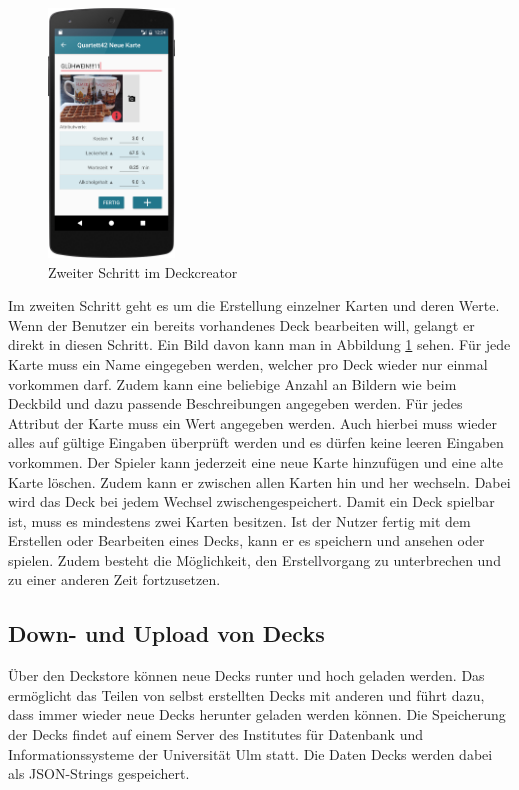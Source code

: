 \begin{figure}[htp]
	\centering
  	\includegraphics[width=0.3\textwidth]{img/screenshots/device_new_card.png}
	\caption{Zweiter Schritt im Deckcreator}
	\label{figure:implementierungdeckeditor}
\end{figure}

Im zweiten Schritt geht es um die Erstellung einzelner Karten und deren Werte. Wenn der Benutzer ein bereits vorhandenes Deck bearbeiten will, gelangt er direkt in diesen Schritt. Ein Bild davon kann man in Abbildung \ref{figure:implementierungdeckeditor} sehen. Für jede Karte muss ein Name eingegeben werden, welcher pro Deck wieder nur einmal vorkommen darf. Zudem kann eine beliebige Anzahl an Bildern wie beim Deckbild und dazu passende Beschreibungen angegeben werden. Für jedes Attribut der Karte muss ein Wert angegeben werden. Auch hierbei muss wieder alles auf gültige Eingaben überprüft werden und es dürfen keine leeren Eingaben vorkommen. Der Spieler kann jederzeit eine neue Karte hinzufügen und eine alte Karte löschen. Zudem kann er zwischen allen Karten hin und her wechseln. Dabei wird das Deck bei jedem Wechsel zwischengespeichert. Damit ein Deck spielbar ist, muss es mindestens zwei Karten besitzen. Ist der Nutzer fertig mit dem Erstellen oder Bearbeiten eines Decks, kann er es speichern und ansehen oder spielen. Zudem besteht die Möglichkeit, den Erstellvorgang zu unterbrechen und zu einer anderen Zeit fortzusetzen.

\subsection{Down- und Upload von Decks}
\label{sec:implementierung:besonderheiten:deckdownload }

Über den Deckstore können neue Decks runter und hoch geladen werden. Das ermöglicht das Teilen von selbst erstellten Decks mit anderen und führt dazu, dass immer wieder neue Decks herunter geladen werden können. Die Speicherung der Decks findet auf einem Server des Institutes für Datenbank und Informationssysteme der Universität Ulm statt. Die Daten Decks werden dabei als JSON-Strings gespeichert. 

